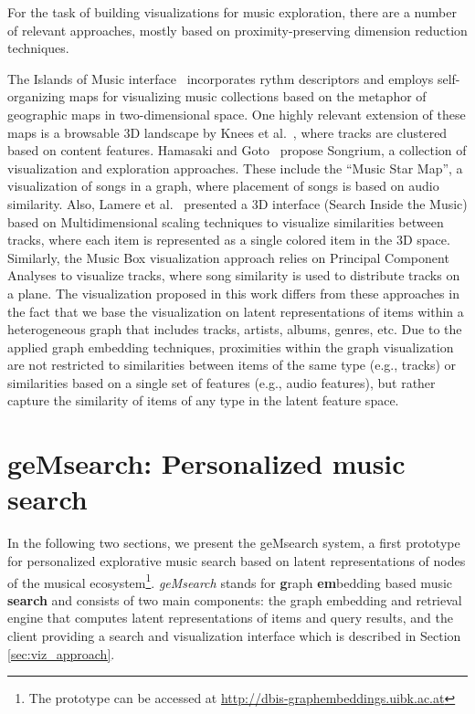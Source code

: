\documentclass[sigconf]{acmart}
\begin{document}
For the task of building visualizations for music exploration, there are a number of relevant approaches, mostly based on proximity-preserving dimension reduction techniques. 

The Islands of Music interface~\cite{pampalk2001islands} incorporates rythm descriptors and employs self-organizing maps for visualizing music collections based on the metaphor of geographic maps in two-dimensional space. One highly relevant extension of these maps is a browsable 3D landscape by Knees et al.~\cite{knees2006innovative}, where tracks are clustered based on content features. %
Hamasaki and Goto~\cite{Hamasaki:2013:SMB:2491055.2491059} propose Songrium, a collection of visualization and exploration approaches. These include the ``Music Star Map'', a visualization of songs in a graph, where placement of songs is based on audio similarity. Also, Lamere et al.~\cite{lamere2007using} presented a 3D interface (Search Inside the Music) based on Multidimensional scaling techniques to visualize similarities between tracks, where each item is represented as a single colored item in the 3D space. Similarly, the Music Box visualization approach relies on Principal Component Analyses to visualize tracks, where song similarity is used to distribute tracks on a plane. %
The visualization proposed in this work differs from these approaches in the fact that we base the visualization on latent representations of items within a heterogeneous graph that includes tracks, artists, albums, genres, etc. Due to the applied graph embedding techniques, proximities within the graph visualization are not restricted to similarities between items of the same type (e.g., tracks) or similarities based on a single set of features (e.g., audio features), but rather capture the similarity of items of any type in the latent feature space.

\section{geMsearch: Personalized music search}
\label{sec:gemsearch}
In the following two sections, we present the geMsearch system, a first prototype for personalized explorative music search based on latent representations of nodes of the musical ecosystem\footnote{The prototype can be accessed at \url{http://dbis-graphembeddings.uibk.ac.at}}.
\emph{geMsearch} stands for \textbf{g}raph \textbf{em}bedding based music \textbf{search} and consists of two main components: the graph embedding and retrieval engine that computes latent representations of items and query results, and the client providing a search and visualization interface which is described in Section \ref{sec:viz_approach}. 
\end{document}
